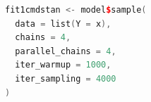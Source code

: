 \begin{lstlisting}[language=C++,label={code:18_06},caption={cmdstanrパッケージによるオプション指定}]
fit1cmdstan <- model$sample(
  data = list(Y = x),
  chains = 4,
  parallel_chains = 4,
  iter_warmup = 1000,
  iter_sampling = 4000
)
\end{lstlisting}
